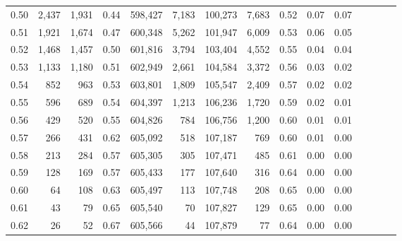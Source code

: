 \begin{tabular}{rrrcrrrrrrrrrrr}
0.50 &   2,437 &  1,931 &                                       0.44 &  598,427 &    7,183 &  100,273 &    7,683 &  0.52 &  0.07 &                         0.07 \\
0.51 &   1,921 &  1,674 &                                       0.47 &  600,348 &    5,262 &  101,947 &    6,009 &  0.53 &  0.06 &                         0.05 \\
0.52 &   1,468 &  1,457 &                                       0.50 &  601,816 &    3,794 &  103,404 &    4,552 &  0.55 &  0.04 &                         0.04 \\
0.53 &   1,133 &  1,180 &                                       0.51 &  602,949 &    2,661 &  104,584 &    3,372 &  0.56 &  0.03 &                         0.02 \\
0.54 &     852 &    963 &                                       0.53 &  603,801 &    1,809 &  105,547 &    2,409 &  0.57 &  0.02 &                         0.02 \\
0.55 &     596 &    689 &                                       0.54 &  604,397 &    1,213 &  106,236 &    1,720 &  0.59 &  0.02 &                         0.01 \\
0.56 &     429 &    520 &                                       0.55 &  604,826 &      784 &  106,756 &    1,200 &  0.60 &  0.01 &                         0.01 \\
0.57 &     266 &    431 &                                       0.62 &  605,092 &      518 &  107,187 &      769 &  0.60 &  0.01 &                         0.00 \\
0.58 &     213 &    284 &                                       0.57 &  605,305 &      305 &  107,471 &      485 &  0.61 &  0.00 &                         0.00 \\
0.59 &     128 &    169 &                                       0.57 &  605,433 &      177 &  107,640 &      316 &  0.64 &  0.00 &                         0.00 \\
0.60 &      64 &    108 &                                       0.63 &  605,497 &      113 &  107,748 &      208 &  0.65 &  0.00 &                         0.00 \\
0.61 &      43 &     79 &                                       0.65 &  605,540 &       70 &  107,827 &      129 &  0.65 &  0.00 &                         0.00 \\
0.62 &      26 &     52 &                                       0.67 &  605,566 &       44 &  107,879 &       77 &  0.64 &  0.00 &                         0.00 \\

\end{tabular}
